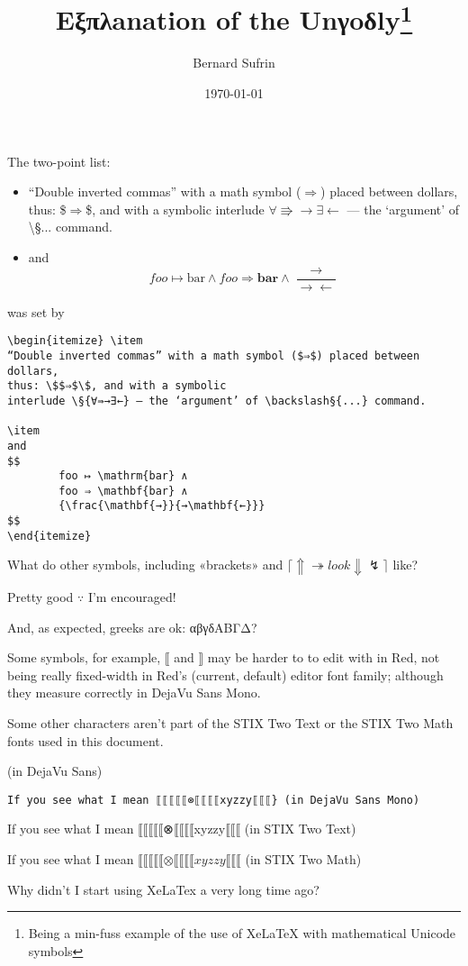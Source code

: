 \documentclass[11pt,a4paper]{article}
\author{Bernard Sufrin}
\title{Eξπλanation of the Unγoδly\footnote{Being a min-fuss example of the use of
XeLaTeX
with mathematical Unicode symbols}}
\date{\today}
\def\§#1{\symbolfamily{#1}}
\def\§#1{${#1}$}
\begin{document}
\maketitle

The two-point list:

\begin{itemize} \item
“Double inverted commas” with a math symbol ($⇒$) placed between dollars,
thus: \$$⇒$\$, and with a symbolic
interlude \§{∀⇛→∃←} — the ‘argument’ of \backslash§{...} command.

\item
and 
$$
        foo ↦ \mathrm{bar} ∧
        foo ⇒ \mathbf{bar} ∧
        {\frac{\mathbf{→}}{→\mathbf{←}}}
$$
\end{itemize}
was set by
\begin{verbatim}
\begin{itemize} \item
“Double inverted commas” with a math symbol ($⇒$) placed between dollars,
thus: \$$⇒$\$, and with a symbolic
interlude \§{∀⇛→∃←} — the ‘argument’ of \backslash§{...} command.

\item
and 
$$
        foo ↦ \mathrm{bar} ∧
        foo ⇒ \mathbf{bar} ∧
        {\frac{\mathbf{→}}{→\mathbf{←}}}
$$
\end{itemize}
\end{verbatim}
What do other symbols, including «brackets» and  $ ⌈⇑ ↠ look ⇓  ↯ ⌉$ like?


Pretty good $∵$ I'm encouraged!

And, as expected, greeks are ok:  αβγδΑΒΓΔ?

Some symbols, for example, $⟦$ and $⟧$ may be harder to
to edit with in Red, not being really fixed-width in
Red's (current, default) editor
font family; although they measure correctly in
DejaVu Sans Mono.

Some other characters aren't part of the STIX Two Text
or the STIX Two Math fonts used in this document.

\bgroup{} (in DejaVu Sans)\egroup

\verb/If you see what I mean ⟦⟦⟦⟦⟦⊗⟦⟦⟦⟦xyzzy⟦⟦⟦} (in DejaVu Sans Mono)/

If you see what I mean ⟦⟦⟦⟦⟦⊗⟦⟦⟦⟦xyzzy⟦⟦⟦ (in STIX Two Text)

If you see what I mean $⟦⟦⟦⟦⟦⊗⟦⟦⟦⟦xyzzy⟦⟦⟦$ (in STIX Two Math)




Why didn't I start using XeLaTex a very long time ago?
\end{document}
